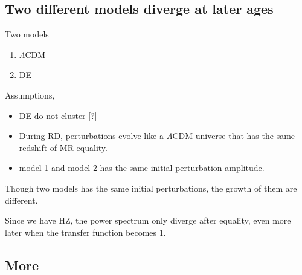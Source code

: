 \subsection{Two different models diverge at later ages}

Two models
\begin{enumerate}
\item $\Lambda$CDM
\item DE
\end{enumerate}



Assumptions,
\begin{itemize}
\item  DE do not cluster [?]
\item  During RD, perturbations evolve like a $\Lambda$CDM universe that has the same redshift of MR equality.
\item  model 1 and model 2 has the same initial perturbation amplitude.
\end{itemize}





Though two models has the same initial perturbations, the growth of them are different.

Since we have HZ, the power spectrum only diverge after equality, even more later when the transfer function becomes 1.






\subsection{More}

